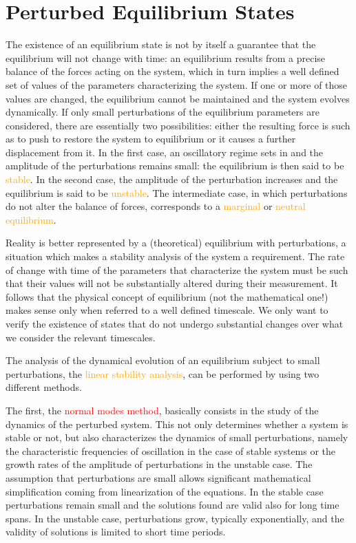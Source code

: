 \documentclass[12pt,a4paper]{article}
\newcounter{theo}[section]\setcounter{theo}{0}
\begin{document}
\section{Perturbed Equilibrium States}
The existence of an equilibrium state is not by itself a guarantee that the equilibrium will not change with time: an equilibrium results from a precise balance of the forces acting on the system, which in turn implies a well defined set of values of the parameters characterizing the system. If one or more of those values are changed, the equilibrium cannot be maintained and the system evolves dynamically. If only small perturbations of the equilibrium parameters are considered, there are essentially two possibilities: either the resulting force is such as to push to restore the system to equilibrium or it causes a further displacement from it. In the first case, an oscillatory regime sets in and the amplitude of the perturbations remains small: the equilibrium is then said to be \textcolor{orange}{stable}. In the second case, the amplitude of the perturbation increases and the equilibrium is said to be \textcolor{orange}{unstable}. The intermediate case, in which perturbations do not alter the balance of forces, corresponds to a \textcolor{orange}{marginal} or \textcolor{orange}{neutral equilibrium}.

Reality is better represented by a (theoretical) equilibrium with perturbations, a situation which makes a stability analysis of the system a requirement. The rate of change with time of the parameters that characterize the system must be such that their values will not be substantially altered during their measurement. It follows that the physical concept of equilibrium (not the mathematical one!) makes sense only when referred to a well defined timescale. We only want to verify the existence of states that do not undergo substantial changes over what we consider the relevant timescales. 

The analysis of the dynamical evolution of an equilibrium subject to small perturbations, the \textcolor{orange}{ linear stability analysis}, can be performed by using two different methods.

The first, the \textcolor{red}{normal modes method}, basically consists in the study of the dynamics of the perturbed system. This not only determines whether a system is stable or not, but also characterizes the dynamics of small perturbations, namely the characteristic frequencies of oscillation in the case of stable systems or the growth rates of the amplitude of perturbations in the unstable case. The assumption that perturbations are small allows significant mathematical simplification coming from linearization of the equations. In the stable case perturbations remain small and the solutions found are valid also for long time spans. In the unstable case, perturbations grow, typically exponentially, and the validity of solutions is limited to short time periods.
\end{document}
